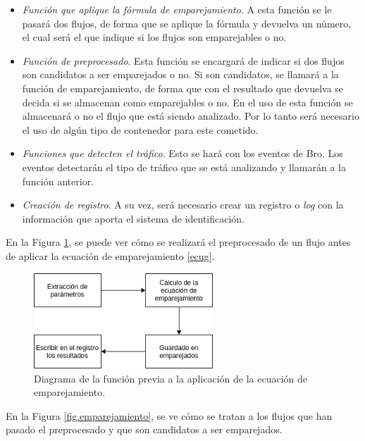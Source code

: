 \begin{itemize}
\item \textit{Función que aplique la fórmula de emparejamiento}. 
\intro A esta función se le pasará dos flujos, de forma que se aplique la fórmula y devuelva un número, el cual 
será el que indique si los flujos son emparejables o no.
\item \textit{Función de preprocesado}. 
\intro Esta función se encargará de indicar si dos flujos son candidatos a ser emparejados o no. Si son candidatos, se llamará a la función de emparejamiento, de forma que con el resultado que devuelva se decida si se almacenan como emparejables o no.
\intro En el uso de esta función se almacenará o no el flujo que está siendo analizado. Por lo tanto será necesario el uso de algún tipo de contenedor para este cometido.
\item \textit{Funciones que detecten el tráfico}. 
\intro Esto se hará con los eventos de Bro. Los eventos detectarán el tipo de tráfico que se está analizando y llamarán a la función 
anterior.
\item \textit{Creación de registro}.
\intro A su vez, será necesario crear un registro o \textit{log} con la información que aporta el sistema de identificación.
\end{itemize}

\intro En la Figura \ref{fig.calculo}, se puede ver cómo se realizará el preprocesado de un flujo antes de aplicar la ecuación de emparejamiento \ref{ecug}.

\begin{figure}[H]
  \includegraphics[width=0.6\textwidth]{imagenes/calculo.png}
  \centering
  \caption{Diagrama de la función previa a la aplicación de la ecuación de emparejamiento.}\label{fig.calculo}
\end{figure}

\intro En la Figura \ref{fig.emparejamiento}, se ve cómo se tratan a los flujos que han pasado el preprocesado y que son candidatos a ser emparejados.

